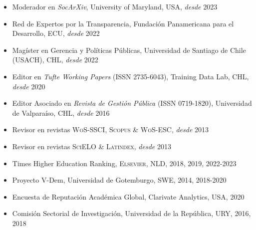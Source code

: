 





\begin{publications}

\begin{itemize}
\item{\small Moderador en {\itshape SocArXiv}, University of Maryland, USA, {\itshape desde} 2023}
\item{\small Red de Expertos por la Transparencia, Fundación Panamericana para el Desarrollo, ECU, {\itshape desde} 2022}
\item{\small Magíster en Gerencia y Políticas Públicas, Universidad de Santiago de Chile (USACH), CHL, {\itshape desde} 2022}
\item{\small Editor en {\itshape Tufte Working Papers} (ISSN 2735-6043), Training Data Lab, CHL, {\itshape desde} 2020}
\item{\small Editor Asociado en {\itshape Revista de Gestión Pública} (ISSN 0719-1820), Universidad de Valparaíso, CHL, {\itshape desde} 2016}
\item{\small Revisor en revistas {\scshape WoS-SSCI}, {\scshape Scopus} \& {\scshape WoS-ESC}, {\itshape desde} 2013}
\item{\small Revisor en revistas {\scshape SciELO} \& {\scshape Latindex}, {\itshape desde} 2013}
\item{\small Times Higher Education Ranking, {\scshape Elsevier}, NLD, 2018, 2019, 2022-2023}
\item{\small Proyecto V-Dem, Universidad de Gotemburgo, SWE, 2014, 2018-2020}
\item{\small Encuesta de Reputación Académica Global, Clarivate Analytics, USA, 2020}
\item{\small Comisión Sectorial de Investigación, Universidad de la República, URY, 2016, 2018}
\end{itemize}

\vspace{1mm}
\end{publications}
